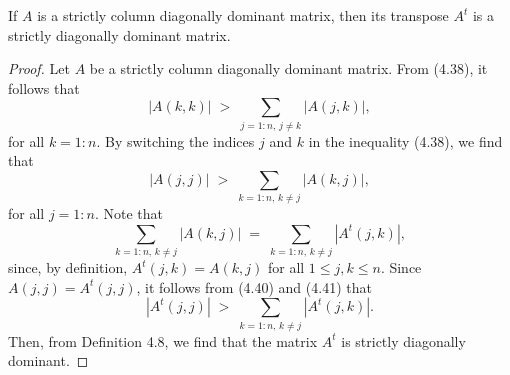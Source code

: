\begin{lemma}
If $A$ is a strictly column diagonally dominant matrix, then its transpose $A^t$ is a
strictly diagonally dominant matrix.
\end{lemma}

\begin{proof}
Let $A$ be a strictly column diagonally dominant matrix. From (4.38), it follows that
\begin{equation}
|A(k,k)| \;>\; \sum_{j=1:n,\, j \neq k} |A(j,k)|,
\end{equation}
for all $k = 1:n$. By switching the indices $j$ and $k$ in the inequality (4.38), we
find that
\begin{equation}
|A(j,j)| \;>\; \sum_{k=1:n,\, k \neq j} |A(k,j)|,
\end{equation}
for all $j = 1:n$. Note that
\begin{equation}
\sum_{k=1:n,\, k \neq j} |A(k,j)| \;=\; \sum_{k=1:n,\, k \neq j} |A^t(j,k)|,
\end{equation}
since, by definition, $A^t(j,k) = A(k,j)$ for all $1 \leq j,k \leq n$. Since
$A(j,j) = A^t(j,j)$, it follows from (4.40) and (4.41) that
\[
|A^t(j,j)| \;>\; \sum_{k=1:n,\, k \neq j} |A^t(j,k)|.
\]
Then, from Definition 4.8, we find that the matrix $A^t$ is strictly diagonally
dominant.
\end{proof}
